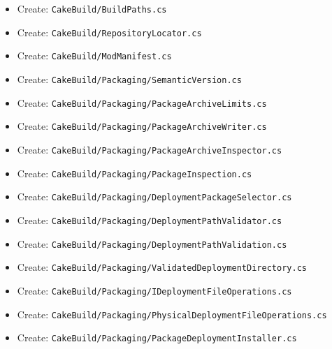 \documentclass[
  10pt,
  letterpaper,
]{article}
\providecommand{\tightlist}{%
  \setlength{\itemsep}{0pt}\setlength{\parskip}{0pt}}
\begin{document}
\begin{itemize}
\tightlist
\item
  Create:
  \texttt{CakeBuild/}\allowbreak{}\texttt{BuildPaths.}\allowbreak{}\texttt{cs}
\item
  Create:
  \texttt{CakeBuild/}\allowbreak{}\texttt{RepositoryLocator.}\allowbreak{}\texttt{cs}
\item
  Create:
  \texttt{CakeBuild/}\allowbreak{}\texttt{ModManifest.}\allowbreak{}\texttt{cs}
\item
  Create:
  \texttt{CakeBuild/}\allowbreak{}\texttt{Packaging/}\allowbreak{}\texttt{SemanticVersion.}\allowbreak{}\texttt{cs}
\item
  Create:
  \texttt{CakeBuild/}\allowbreak{}\texttt{Packaging/}\allowbreak{}\texttt{PackageArchiveLimits.}\allowbreak{}\texttt{cs}
\item
  Create:
  \texttt{CakeBuild/}\allowbreak{}\texttt{Packaging/}\allowbreak{}\texttt{PackageArchiveWriter.}\allowbreak{}\texttt{cs}
\item
  Create:
  \texttt{CakeBuild/}\allowbreak{}\texttt{Packaging/}\allowbreak{}\texttt{PackageArchiveInspector.}\allowbreak{}\texttt{cs}
\item
  Create:
  \texttt{CakeBuild/}\allowbreak{}\texttt{Packaging/}\allowbreak{}\texttt{PackageInspection.}\allowbreak{}\texttt{cs}
\item
  Create:
  \texttt{CakeBuild/}\allowbreak{}\texttt{Packaging/}\allowbreak{}\texttt{DeploymentPackageSelector.}\allowbreak{}\texttt{cs}
\item
  Create:
  \texttt{CakeBuild/}\allowbreak{}\texttt{Packaging/}\allowbreak{}\texttt{DeploymentPathValidator.}\allowbreak{}\texttt{cs}
\item
  Create:
  \texttt{CakeBuild/}\allowbreak{}\texttt{Packaging/}\allowbreak{}\texttt{DeploymentPathValidation.}\allowbreak{}\texttt{cs}
\item
  Create:
  \texttt{CakeBuild/}\allowbreak{}\texttt{Packaging/}\allowbreak{}\texttt{ValidatedDeploymentDirectory.}\allowbreak{}\texttt{cs}
\item
  Create:
  \texttt{CakeBuild/}\allowbreak{}\texttt{Packaging/}\allowbreak{}\texttt{IDeploymentFileOperations.}\allowbreak{}\texttt{cs}
\item
  Create:
  \texttt{CakeBuild/}\allowbreak{}\texttt{Packaging/}\allowbreak{}\texttt{PhysicalDeploymentFileOperations.}\allowbreak{}\texttt{cs}
\item
  Create:
  \texttt{CakeBuild/}\allowbreak{}\texttt{Packaging/}\allowbreak{}\texttt{PackageDeploymentInstaller.}\allowbreak{}\texttt{cs}

\end{itemize}
\end{document}
